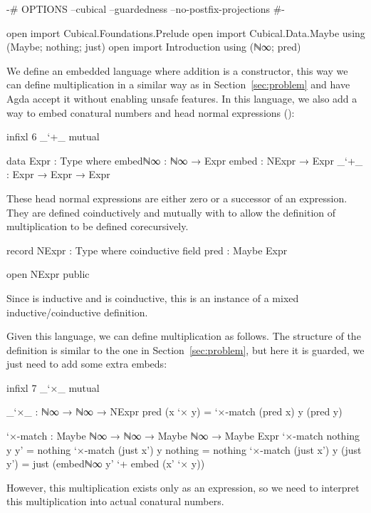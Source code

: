 \begin{code}[hide]
{-# OPTIONS --cubical --guardedness --no-postfix-projections #-}

open import Cubical.Foundations.Prelude
open import Cubical.Data.Maybe using (Maybe; nothing; just)
open import Introduction using (ℕ∞; pred)
\end{code}
We define an embedded language where addition is a constructor, this way we can
define multiplication in a similar way as in Section~\ref{sec:problem} and have
Agda accept it without enabling unsafe features. In this language, we also add a
way to embed conatural numbers and head normal expressions ():
\begin{code}[hide]
infixl 6 _`+_
mutual
\end{code}
\begin{code}
  data Expr : Type where
    embedℕ∞  : ℕ∞ → Expr
    embed    : NExpr → Expr
    _`+_     : Expr → Expr → Expr
\end{code}
These head normal expressions are either zero or a successor of an expression.
They are defined coinductively and mutually with  to allow
the definition of multiplication to be defined corecursively.
\begin{code}
  record NExpr : Type where
    coinductive
    field
      pred : Maybe Expr
\end{code}
\begin{code}[hide]
open NExpr public
\end{code}
Since  is inductive and  is coinductive,
this is an instance of a mixed inductive/coinductive definition.

Given this language, we can define multiplication as follows. The structure of
the definition is similar to the one in Section~\ref{sec:problem}, but here it
is guarded, we just need to add some extra embeds:
\begin{code}[hide]
infixl 7 _`×_
mutual
\end{code}
\begin{code}
  _`×_ : ℕ∞ → ℕ∞ → NExpr
  pred (x `× y) = `×-match (pred x) y (pred y)

  `×-match :
    Maybe ℕ∞ → ℕ∞ → Maybe ℕ∞ → Maybe Expr
  `×-match nothing    y y'         = nothing
  `×-match (just x')  y nothing    = nothing
  `×-match (just x')  y (just y')  =
    just (embedℕ∞ y' `+ embed (x' `× y))
\end{code}
However, this multiplication exists only as an expression, so we need to
interpret this multiplication into actual conatural numbers.

